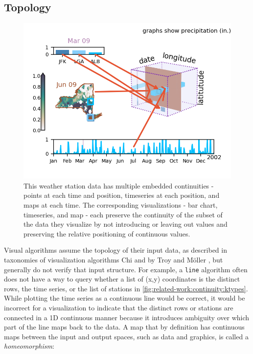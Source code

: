 \documentclass[journal]{IEEEtran}
\theoremstyle{definition}
\theoremstyle{remark}
\begin{document}
\subsection{Topology}
\label{sec:related-work:continuity}

\begin{figure}[H]
  \includegraphics[width=1\columnwidth]{k_different_types.png}
  \caption{This weather station data has multiple embedded continuities - points at each time and position, timeseries at each position, and maps at each time. The corresponding visualizations - bar chart, timeseries, and map - each preserve the continuity of the subset of the data they visualize by not introducing or leaving out values and preserving the relative positioning of continuous values.}
%
  \label{fig:related-work:continuity:ktypes}
\end{figure}

Visual algorithms assume the topology of their input data, as described in taxonomies of visualization algorithms Chi\cite{chiTaxonomyVisualizationTechniques2000} and by Troy and M\"{o}ller \cite{toryRethinkingVisualizationHighlevel2004}, but generally do not verify that input structure. For example, a \texttt{line} algorithm often does not have a way to query whether a list of (x,y) coordinates is the distinct rows, the time series, or the list of stations in \autoref{fig:related-work:continuity:ktypes}. While plotting the time series as a continuous line would be correct, it would be incorrect for a visualization to indicate that the distinct rows or stations are connected in a 1D continuous manner because it introduces ambiguity over which part of the line maps back to the data. A map that by definition has continuous maps between the input and output spaces, such as data and graphics, is called a \textit{homeomorphism}\cite{riehlCategoryTheoryContext}:
\end{document}
